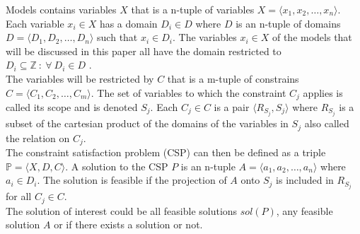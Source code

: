 Models contains variables $X$ that is a n-tuple of variables $X = \langle x_1, x_2, \dots , x_n \rangle $. Each 
variable $x_i \in X$ has a domain $D_i \in D$ where $D$ is an n-tuple of domains $D = \langle D_1, D_2, \dots , D_n 
\rangle $ such that $x_i \in D_i$. The variables $x_i \in X$ of the models that will be discussed in this paper all 
have the domain restricted to $D_i \subseteq \mathbb{Z}\ : \: \forall \ D_i \in D$ . \\ 
The variables will be restricted by $C$ that is a m-tuple of constrains $C= \langle 
C_1,C_2, \dots , C_m \rangle $. The set of variables to which the constraint $C_j$ applies is called its scope and 
is denoted $S_j$. Each $C_j \in C$ is a pair $\langle R_{S_j}, S_j \rangle $ where $ R_{S_j}$ is a subset of the 
cartesian product of the domains of the variables in $S_j$ also called the relation on $C_j$. \\ 
The constraint satisfaction problem (CSP) can then be defined as a triple $\mathbb{P} = \langle X,D,C \rangle$. A 
solution to the CSP $P$ is an n-tuple $A = \langle a_1,a_2,\dots,a_n\rangle $ where $a_i \in 
D_i$. The solution is feasible if the projection of $A$ onto $S_j$ is included in $R_{S_j}$ for all 
$C_j \in C$.\\ 
The solution of interest could be all feasible solutions $sol(P)$, any feasible solution $A$ or if there 
exists a solution or not.  






